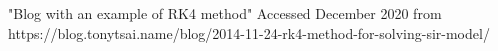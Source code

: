 \begin{thebibliography}{9}
     "Blog with an example of RK4 method" Accessed December 2020 from https://blog.tonytsai.name/blog/2014-11-24-rk4-method-for-solving-sir-model/

\end{thebibliography}